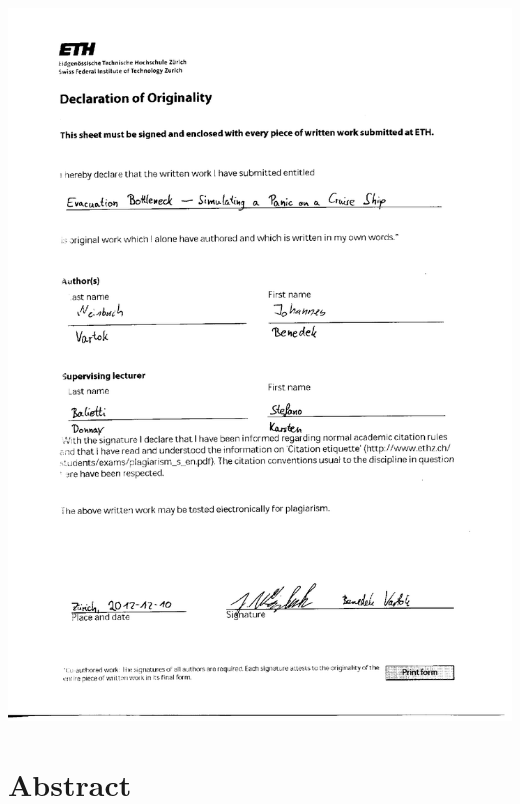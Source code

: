 \documentclass[11pt]{article}
\begin{document}
\begin{center}
		
\includegraphics[scale=0.7]{images/declaration.pdf}

\end{center}
\newpage



\tableofcontents

\newpage




\section{Abstract}
\end{document}
